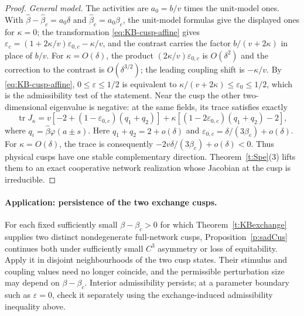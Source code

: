 \begin{proof}
\emph{General model.} The activities are $a_0=b/v$ times the unit-model
ones. With $\widehat\beta-\widehat\beta_c=a_0\delta$ and
$\widehat\beta_c=a_0\beta_c$, the unit-model formulas give the displayed ones
for $\kappa=0$; the transformation \eqref{eq:KB-cusp-affine} gives
$\varepsilon_c=(1+2\kappa/v)\varepsilon_{0,c}-\kappa/v$, and the contrast carries the
factor $b/(v+2\kappa)$ in place of $b/v$. For $\kappa=O(\delta)$, the product
$(2\kappa/v)\varepsilon_{0,c}$ is $O(\delta^2)$ and the correction
to the contrast is $O(\delta^{3/2})$; the leading coupling shift
is $-\kappa/v$.
By \eqref{eq:KB-cusp-affine}, $0\le\varepsilon\le1/2$ is equivalent to
$\kappa/(v+2\kappa)\le\varepsilon_0\le1/2$, which is the admissibility test of the statement.
Near the cusp the other two-dimensional eigenvalue is negative:
at the same fields, its trace satisfies exactly
\[
 \operatorname{tr}J_\kappa
 =v[-2+(1-\varepsilon_{0,c})(q_1+q_2)]
  +\kappa[(1-2\varepsilon_{0,c})(q_1+q_2)-2],
\]
where
$q_i=\widehat\beta\varphi(a\pm s)$.
Here $q_1+q_2=2+o(\delta)$ and
$\varepsilon_{0,c}=\delta/(3\beta_c)+o(\delta)$.
For $\kappa=O(\delta)$, the trace is consequently
$-2v\delta/(3\beta_c)+o(\delta)<0$.
Thus physical cusps have one stable complementary direction.
Theorem~\ref{t:Spe}(3) lifts them to an exact cooperative
network realization whose Jacobian at the cusp is irreducible.
\end{proof}

\paragraph{Application: persistence of the two exchange cusps.}
For each fixed sufficiently small $\beta-\beta_c>0$ for which
Theorem~\ref{t:KBexchange} supplies two distinct nondegenerate
full-network cusps, Proposition~\ref{p:sadCus} continues both under
sufficiently small $C^3$ asymmetry or loss of equitability.
Apply it in disjoint neighbourhoods of the two cusp states.
Their stimulus and coupling values need no longer coincide,
and the permissible perturbation size may depend on $\beta-\beta_c$.
Interior admissibility persists; at a parameter boundary such as
$\varepsilon=0$, check it separately using the exchange-induced
admissibility inequality above.

